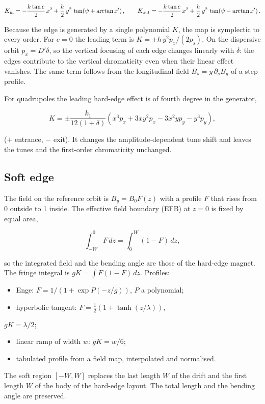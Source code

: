 \documentclass[11pt,a4paper]{article}
\begin{document}
\[
K_{\rm in} = -\frac{h\tan e}{2}\,x^2 + \frac{h}{2}\,y^2\,\tan\!\left(\psi + \arctan x'\right),
\qquad
K_{\rm out} = -\frac{h\tan e}{2}\,x^2 + \frac{h}{2}\,y^2\,\tan\!\left(\psi - \arctan x'\right).
\]

Because the edge is generated by a single polynomial $K$, the map is
symplectic to every order. For $e = 0$ the leading term is
$K = \pm h\,y^2 p_x/(2 p_s)$. On the dispersive orbit $p_x = D'\delta$,
so the vertical focusing of each edge changes linearly with $\delta$: the
edges contribute to the vertical chromaticity even when their linear
effect vanishes. The same term follows from the longitudinal field
$B_s = y\,\partial_s B_y$ of a step profile.

For quadrupoles the leading hard-edge effect is of fourth degree in the
generator,

\[
K = \pm\frac{k_1}{12(1+\delta)}\left(x^3 p_x + 3 x y^2 p_x - 3 x^2 y p_y - y^3 p_y\right),
\]

($+$ entrance, $-$ exit). It changes the amplitude-dependent tune shift
and leaves the tunes and the first-order chromaticity unchanged.

\subsection{Soft edge}

The field on the reference orbit is $B_y = B_0 F(z)$ with a profile
$F$ that rises from 0 outside to 1 inside. The effective field boundary
(EFB) at $z = 0$ is fixed by equal area,

\[
\int_{-W}^{0} F\,dz = \int_{0}^{W} (1-F)\,dz,
\]

so the integrated field and the bending angle are those of the hard-edge
magnet. The fringe integral is $gK = \int F(1-F)\,dz$. Profiles:

\begin{itemize}
\item Enge: $F = 1/\left(1+\exp P(-z/g)\right)$, $P$ a polynomial;
\item hyperbolic tangent: $F = \tfrac12\left(1+\tanh(z/\lambda)\right)$,
\end{itemize}
  $gK = \lambda/2$;
\begin{itemize}
\item linear ramp of width $w$: $gK = w/6$;
\item tabulated profile from a field map, interpolated and normalised.
\end{itemize}

The soft region $[-W, W]$ replaces the last length $W$ of the drift
and the first length $W$ of the body of the hard-edge layout. The total
length and the bending angle are preserved.
\end{document}
